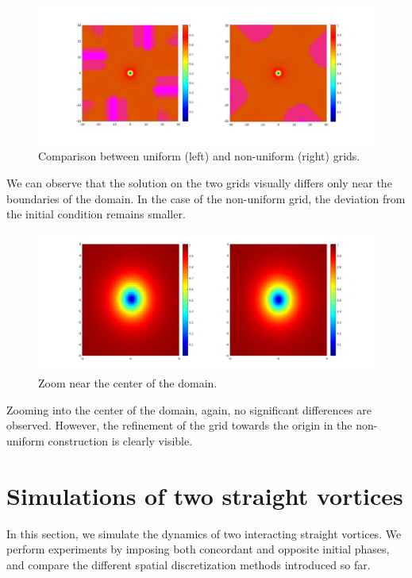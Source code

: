 \begin{figure}[H]
    \centering
    \includegraphics[width=\textwidth]{img/comparison_unfd.pdf}
    \caption{Comparison between uniform (left) and non-uniform (right) grids.}
\end{figure}

We can observe that the solution on the two grids visually differs only near the boundaries of the domain. In the case of the non-uniform grid, the deviation from the initial condition remains smaller.

\begin{figure}[H]
    \centering
    \includegraphics[width=\textwidth]{img/comparison_unfd_5.pdf}
    \caption{Zoom near the center of the domain.}
\end{figure}

Zooming into the center of the domain, again, no significant differences are observed. However, the refinement of the grid towards the origin in the non-uniform construction is clearly visible.

\section{Simulations of two straight vortices}

In this section, we simulate the dynamics of two interacting straight vortices. We perform experiments by imposing both concordant and opposite initial phases, and compare the different spatial discretization methods introduced so far.

